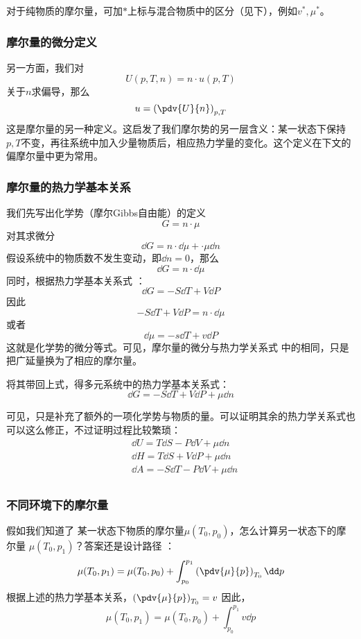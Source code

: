 对于纯物质的摩尔量，可加$*$上标与混合物质中的区分（见下），例如$v^*, \mu^*$。

\subsubsection{摩尔量的微分定义}
另一方面，我们对
$$U(p, T, n) = n \cdot u (p, T)$$
关于$n$求偏导，那么
$$u = \left( \pdv{U}{n} \right)_{p,T}$$
这是摩尔量的另一种定义。这启发了我们摩尔势的另一层含义：某一状态下保持$p,T$不变，再往系统中加入少量物质后，相应热力学量的变化。这个定义在下文的偏摩尔量中更为常用。

\subsubsection{摩尔量的热力学基本关系}

我们先写出化学势（摩尔Gibbs自由能）的定义
$$G = n \cdot \mu$$
对其求微分
$$\dd G = n \cdot \dd \mu + \cdot \mu \dd n$$
假设系统中的物质数不发生变动，即$\dd n = 0$，那么
$$\dd G = n \cdot \dd \mu$$
同时，根据热力学基本关系式 ：
$$\dd G = -S \dd T + V \dd P$$
因此
$$-S \dd T + V \dd P = n \cdot \dd \mu$$
或者
$$
\dd \mu = -s \dd T + v \dd P
$$
这就是化学势的微分等式。可见，摩尔量的微分与热力学关系式 中的相同，只是把广延量换为了相应的摩尔量。

将其带回上式，得多元系统中的热力学基本关系式：
$$\dd G = -S \dd T + V \dd P + \mu \dd n$$

可见，只是补充了额外的一项化学势与物质的量。可以证明其余的热力学关系式也可以这么修正，不过证明过程比较繁琐：
$$
\begin{aligned}
&\dd U = T \dd S - P \dd V + \mu \dd n\\
&\dd H = T \dd S + V \dd P + \mu \dd n\\
&\dd A = -S \dd T - P \dd V + \mu \dd n\\
\end{aligned}
$$

\subsubsection{不同环境下的摩尔量}
假如我们知道了 某一状态下物质的摩尔量$\mu(T_0,p_0)$，怎么计算另一状态下的摩尔量 $\mu(T_0,p_1)$？答案还是设计路径 ：
$$\mu(T_0,p_1) = \mu(T_0,p_0) + \int_{p_0}^{p_1} \left( \pdv{\mu}{p} \right)_{T_0} \dd p$$
根据上述的热力学基本关系，$\left( \pdv{\mu}{p} \right)_{T_0} = v$
因此，$$\mu(T_0,p_1) = \mu(T_0,p_0) + \int_{p_0}^{p_1} v \dd p$$

